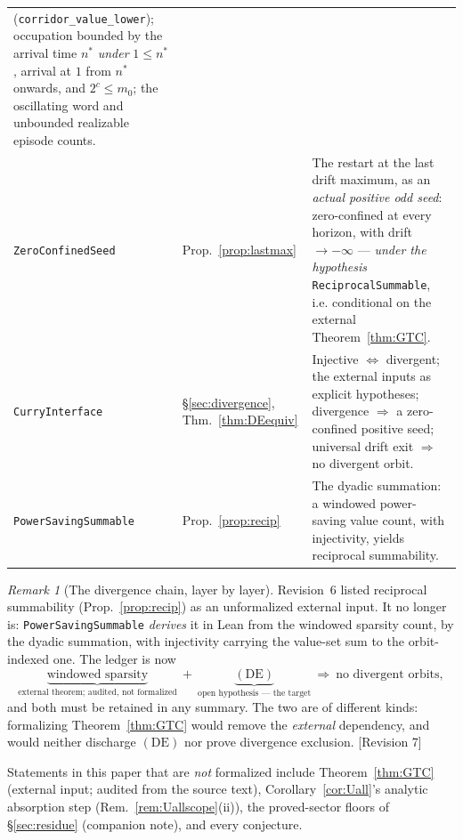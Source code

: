 \documentclass[11pt]{article}
\theoremstyle{plain}
\theoremstyle{definition}
\theoremstyle{remark}
\newtheorem{remark}[theorem]{Remark}
\newcommand{\status}[1]{\textsf{\footnotesize[#1]}}
\begin{document}
\begin{center}
\begin{tabular}{@{}p{}p{}p{}@{}}
(\texttt{corridor\_value\_lower}); occupation bounded by the arrival time $n^*$ \emph{under}
$1\le n^*$, arrival at $1$ from $n^*$ onwards, and $2^{c}\le m_0$; the oscillating word and unbounded realizable episode counts. \\
\texttt{ZeroConfinedSeed} & Prop.~\ref{prop:lastmax} & The restart at the last drift maximum, as an
\emph{actual positive odd seed}: zero-confined at every horizon, with drift $\to-\infty$ ---
\emph{under the hypothesis} \texttt{ReciprocalSummable}, i.e. conditional on the external
Theorem~\ref{thm:GTC}. \\
\texttt{CurryInterface} & \S\ref{sec:divergence}, Thm.~\ref{thm:DEequiv} & Injective $\iff$
divergent; the external inputs as explicit hypotheses; divergence $\Rightarrow$ a zero-confined
positive seed; universal drift exit $\Rightarrow$ no divergent orbit. \\
\texttt{PowerSavingSummable} & Prop.~\ref{prop:recip} & The dyadic summation: a windowed
power-saving value count, with injectivity, yields reciprocal summability. \\
\bottomrule
\end{tabular}
\end{center}

\begin{remark}[The divergence chain, layer by layer]\label{rem:divledger}
Revision~6 listed reciprocal summability (Prop.~\ref{prop:recip}) as an unformalized external
input. It no longer is: \texttt{PowerSavingSummable} \emph{derives} it in Lean from the windowed
sparsity count, by the dyadic summation, with injectivity carrying the value-set sum to the
orbit-indexed one. The ledger is now
\[
\underbrace{\text{windowed sparsity}}_{\text{external theorem; audited, not formalized}}
\ +\
\underbrace{(\mathrm{DE})}_{\text{open hypothesis --- the target}}
\ \Longrightarrow\ \text{no divergent orbits},
\]
and both must be retained in any summary. The two are of different kinds: formalizing
Theorem~\ref{thm:GTC} would remove the \emph{external} dependency, and would neither discharge
$(\mathrm{DE})$ nor prove divergence exclusion. \status{Revision 7}
\end{remark}

Statements in this paper that are \emph{not} formalized include Theorem~\ref{thm:GTC} (external
input; audited from the source text), Corollary~\ref{cor:Uall}'s analytic absorption step
(Rem.~\ref{rem:Uallscope}(ii)), the proved-sector floors of \S\ref{sec:residue} (companion note),
and every conjecture.
\end{document}

